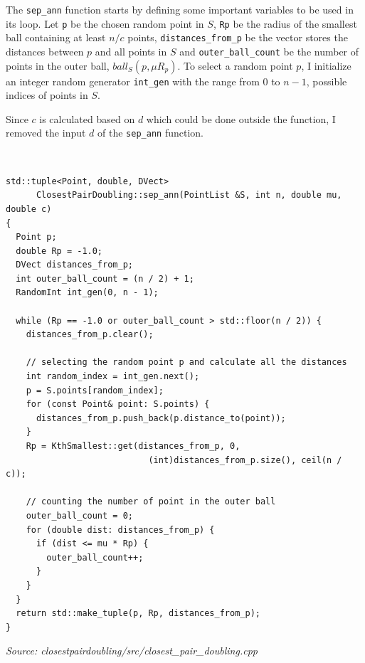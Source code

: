 \documentclass[12pt,english,]{article}
\newcommand{\code}[1]{\colorbox{light-gray}{\texttt{#1}}}
\begin{document}
The \code{sep\_ann} function starts by defining some important variables
to be used in its loop. Let \code{p} be the chosen random point in
\(S\), \code{Rp} be the radius of the smallest ball containing at least
\(n/c\) points, \code{distances\_from\_p} be the vector stores the
distances between \(p\) and all points in \(S\) and
\code{outer\_ball\_count} be the number of points in the outer ball,
\(ball_S(p,\mu R_p)\). To select a random point \(p\), I initialize an
integer random generator \code{int\_gen} with the range from 0 to
\(n - 1\), possible indices of points in \(S\).

Since \(c\) is calculated based on \(d\) which could be done outside the
function, I removed the input \(d\) of the \code{sep\_ann} function.

~

\begin{lstlisting}
std::tuple<Point, double, DVect>
      ClosestPairDoubling::sep_ann(PointList &S, int n, double mu, double c)
{
  Point p;
  double Rp = -1.0;
  DVect distances_from_p;
  int outer_ball_count = (n / 2) + 1;
  RandomInt int_gen(0, n - 1);

  while (Rp == -1.0 or outer_ball_count > std::floor(n / 2)) {
    distances_from_p.clear();

    // selecting the random point p and calculate all the distances
    int random_index = int_gen.next();
    p = S.points[random_index];
    for (const Point& point: S.points) {
      distances_from_p.push_back(p.distance_to(point));
    }
    Rp = KthSmallest::get(distances_from_p, 0,
                            (int)distances_from_p.size(), ceil(n / c));

    // counting the number of point in the outer ball
    outer_ball_count = 0;
    for (double dist: distances_from_p) {
      if (dist <= mu * Rp) {
        outer_ball_count++;
      }
    }
  }
  return std::make_tuple(p, Rp, distances_from_p);
}
\end{lstlisting}
\vspace{-9truemm}
\begin{minipage}{1\textwidth}
  \begin{flushright}
  {\footnotesize \emph{Source: closestpairdoubling/src/closest\_pair\_doubling.cpp}\par}
  \end{flushright}
\end{minipage}
\vspace{0.5truemm}
\end{document}
